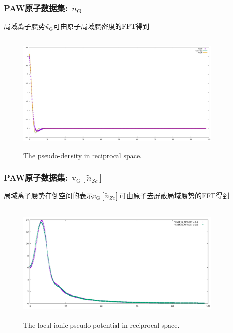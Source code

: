 \frame
{
	\frametitle{\textrm{PAW}原子数据集:~$\tilde{n}_{\mathrm G}$}
	局域离子赝势$\tilde{n_{\mathrm G}}$可由原子局域赝密度的\textrm{FFT}得到
\begin{figure}[h!]
\vskip -0.2in
\centering
\includegraphics[width=4.0in,height=2.35in,viewport=0 0 1530 850, clip]{Figures/PSRHO_G-dat.pdf}
\caption{\tiny \textrm{The pseudo-density in reciprocal space.}}%
\label{pseudo_density_in_reciprocal-space}
\end{figure}
}

\frame
{
	\frametitle{\textrm{PAW}原子数据集:~$\mathrm{v}_{\mathrm G}[\tilde n_{Zc}]$}
	局域离子赝势在倒空间的表示$v_{\mathrm G}[\tilde n_{Zc}]$可由原子去屏蔽局域赝势的\textrm{FFT}得到
\begin{figure}[h!]
\vskip -0.2in
\centering
\includegraphics[width=4.0in,height=2.35in,viewport=0 0 1150 650, clip]{Figures/POT_G-dat.pdf}
\caption{\tiny \textrm{The local ionic pseudo-potential in reciprocal space.}}%
\label{pseudo_potential_in_reciprocal-space}
\end{figure}
}

